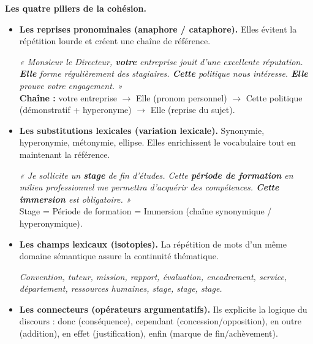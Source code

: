 \documentclass[11pt]{article}
\newcommand{\cle}[1]{{\popxbold\color{popdark}#1}}
\begin{document}
\textbf{Les quatre piliers de la cohésion.}\par

\begin{itemize}
    \item \textbf{Les reprises pronominales (anaphore / cataphore).} Elles évitent la répétition lourde et créent une chaîne de référence.
    \begin{exemplebox}
    \emph{« Monsieur le Directeur, \textbf{votre} entreprise jouit d'une excellente réputation. \textbf{Elle} forme régulièrement des stagiaires. \textbf{Cette} politique nous intéresse. \textbf{Elle} prouve votre engagement. »}\\
    \textbf{Chaîne :} \cle{votre entreprise} $\rightarrow$ \cle{Elle} (pronom personnel) $\rightarrow$ \cle{Cette politique} (démonstratif + hyperonyme) $\rightarrow$ \cle{Elle} (reprise du sujet).
    \end{exemplebox}

    \item \textbf{Les substitutions lexicales (variation lexicale).} Synonymie, hyperonymie, métonymie, ellipse. Elles enrichissent le vocabulaire tout en maintenant la référence.
    \begin{exemplebox}[Substitution]
    \emph{« Je sollicite un \textbf{stage} de fin d'études. Cette \textbf{période de formation} en milieu professionnel me permettra d'acquérir des compétences. \textbf{Cette immersion} est obligatoire. »}\\
    Stage = Période de formation = Immersion (chaîne synonymique / hyperonymique).
    \end{exemplebox}

    \item \textbf{Les champs lexicaux (isotopies).} La répétition de mots d'un même domaine sémantique assure la continuité thématique.
    \begin{exemplebox}
    \emph{Convention, tuteur, mission, rapport, évaluation, encadrement, service, département, ressources humaines, stage, stage, stage.}
    \end{exemplebox}

    \item \textbf{Les connecteurs (opérateurs argumentatifs).} Ils explicite la logique du discours : \cle{donc} (conséquence), \cle{cependant} (concession/opposition), \cle{en outre} (addition), \cle{en effet} (justification), \cle{enfin} (marque de fin/achèvement).
\end{itemize}
\end{document}
